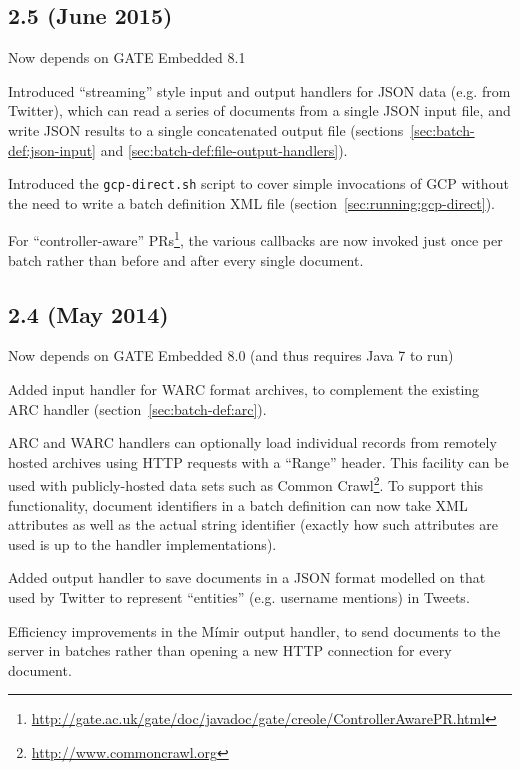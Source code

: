 \subsection{2.5 (June 2015)}

\bit
\item Now depends on GATE Embedded 8.1
\item Introduced ``streaming'' style input and output handlers for JSON
  data (e.g. from Twitter), which can read a series of documents from
  a single JSON input file, and write JSON results to a single concatenated
  output file (sections~\ref{sec:batch-def:json-input} and
  \ref{sec:batch-def:file-output-handlers}).
\item Introduced the \verb!gcp-direct.sh! script to cover simple invocations
  of GCP without the need to write a batch definition XML file
  (section~\ref{sec:running:gcp-direct}).
\item For ``controller-aware''
  PRs\footnote{\url{http://gate.ac.uk/gate/doc/javadoc/gate/creole/ControllerAwarePR.html}},
  the various callbacks are now invoked just once per batch rather than before
  and after every single document.
\eit

\subsection{2.4 (May 2014)}

\bit
\item Now depends on GATE Embedded 8.0 (and thus requires Java 7 to run)
\item Added input handler for WARC format archives, to complement the existing
  ARC handler (section~\ref{sec:batch-def:arc}).
\item ARC and WARC handlers can optionally load individual records from
  remotely hosted archives using HTTP requests with a ``Range'' header.  This
  facility can be used with publicly-hosted data sets such as Common
  Crawl\footnote{\url{http://www.commoncrawl.org}}.  To support this
  functionality, document identifiers in a batch definition can now take XML
  attributes as well as the actual string identifier (exactly how such
  attributes are used is up to the handler implementations).
\item Added output handler to save documents in a JSON format modelled on that
  used by Twitter to represent ``entities'' (e.g. username mentions) in Tweets.
\item Efficiency improvements in the M\'{i}mir output handler, to send
  documents to the server in batches rather than opening a new HTTP connection
  for every document.
\eit

